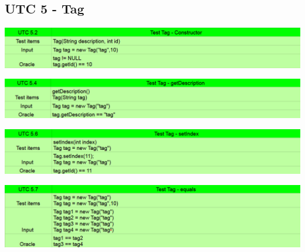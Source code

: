 \subsection{UTC 5 - Tag}
\begin{center} \includegraphics[width=\linewidth]{images/UTC/5-2.png} \end{center}
\begin{center} \includegraphics[width=\linewidth]{images/UTC/5-4.png} \end{center}
\begin{center} \includegraphics[width=\linewidth]{images/UTC/5-6.png} \end{center}
\begin{center} \includegraphics[width=\linewidth]{images/UTC/5-7.png} \end{center}

